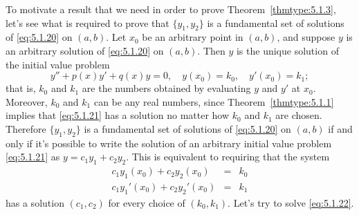 \documentclass{ximera}
\begin{document}
To motivate a result that we need in order to prove
Theorem~\ref{thmtype:5.1.3},
 let's see what is required to prove that  $\{y_1,y_2\}$
is a  fundamental set of solutions of \eqref{eq:5.1.20} on  $(a,b)$.
Let $x_0$ be an arbitrary point in  $(a,b)$, and
suppose  $y$ is an arbitrary  solution of
\eqref{eq:5.1.20} on  $(a,b)$.  Then $y$ is the unique solution of the
initial value problem
\begin{equation}\label{eq:5.1.21}
y''+p(x)y'+q(x)y=0,\quad y(x_0)=k_0,\quad y'(x_0)=k_1;
\end{equation}
that is, $k_0$ and $k_1$ are the numbers obtained by evaluating $y$
and $y'$ at $x_0$. Moreover, $k_0$ and $k_1$ can be any real numbers,
since Theorem~\ref{thmtype:5.1.1} implies that \eqref{eq:5.1.21} has a
solution no matter how $k_0$ and $k_1$ are chosen.
Therefore  $\{y_1,y_2\}$ is a fundamental set of solutions of
\eqref{eq:5.1.20} on $(a,b)$ if and only if it's possible to write the
solution of an arbitrary initial value problem \eqref{eq:5.1.21}
as $y=c_1y_1+c_2y_2$. This is equivalent to requiring that the
system
\begin{equation}\label{eq:5.1.22}
\begin{array}{rcl}
c_1y_1(x_0)+c_2y_2(x_0)&=&k_0\\
c_1y_1'(x_0)+c_2y_2'(x_0)&=&k_1
\end{array}
\end{equation}
has  a solution $(c_1,c_2)$ for every choice of $(k_0,k_1)$.
Let's try to solve \eqref{eq:5.1.22}.
\end{document}
